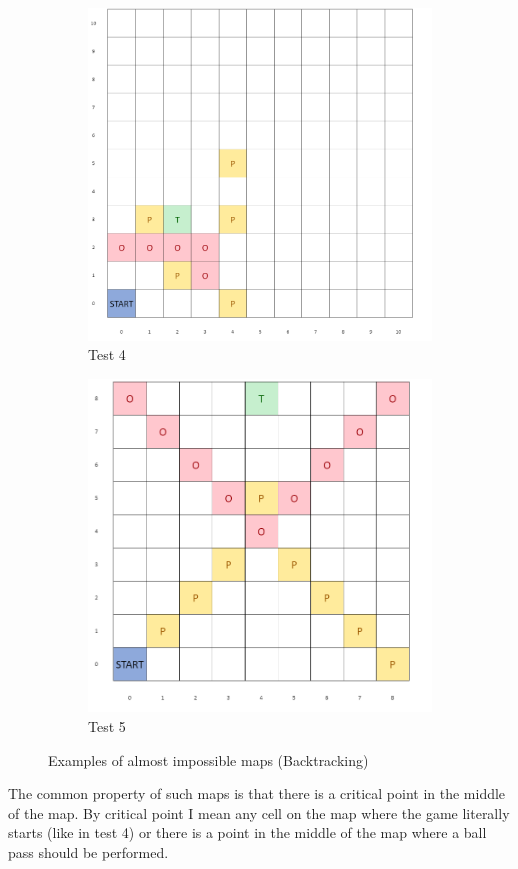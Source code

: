 \documentclass{article}
\begin{document}
\begin{figure}[ht]
   	 \centering
     \begin{subfigure}[b]{0.45\textwidth}
         \centering
         \includegraphics[width=\textwidth]{images/image3.png}
         \caption{Test 4}
         \label{fig:test4}
     \end{subfigure}
     \hfill
     \begin{subfigure}[b]{0.45\textwidth}
         \centering
         \includegraphics[width=\textwidth]{images/test5.png}
         \caption{Test 5}
         \label{fig:test5}
     \end{subfigure}
     \caption{Examples of almost impossible maps (Backtracking)}
\end{figure}
The common property of such maps is that there is a critical point in the middle of the map. By critical point I mean any cell on the map where the game literally starts (like in test 4) or there is a point in the middle of the map where a ball pass should be performed. 
\end{document}
